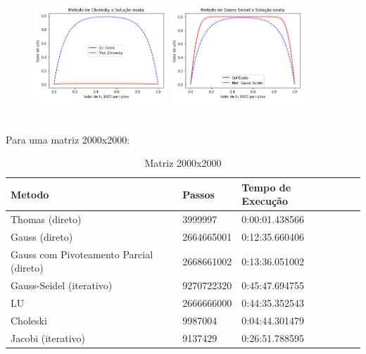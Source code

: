 \documentclass{article}
\begin{document}
\begin{itemize}
\begin{figure}[!htb]
\includegraphics [width=5cm,height=5cm]{Cho1000part.png}
\includegraphics [width=5cm,height=5cm]{GS1000part.png}
\end{figure}


\newpage

\text Para uma matriz 2000x2000:

\begin{table}[h]
\centering
  \begin{tabular}{l||l|lll}
    Metodo & Passos & Tempo de Execução \\
    \hline
    Thomas (direto) & 3999997  & 0:00:01.438566 \\
    
    Gauss (direto) & 2664665001 & 0:12:35.660406 \\
    
    Gauss com Pivoteamento Parcial (direto) & 2668661002 & 0:13:36.051002 \\
    
    Gauss-Seidel (iterativo) & 9270722320  &  0:45:47.694755 \\
    
    LU & 2666666000 & 0:44:35.352543 \\
    
    Choleski & 9987004 & 0:04:44.301479 \\
    
    Jacobi (iterativo) & 9137429 & 0:26:51.788595  \\
    \hline
  \end{tabular}
  \caption{Matriz 2000x2000}
\end{table}



\end{itemize}
\end{document}
